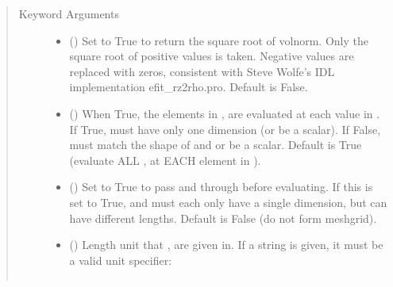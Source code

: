 \documentclass[letterpaper,10pt,english]{sphinxmanual}
\begin{document}
\begin{fulllineitems}
\begin{fulllineitems}
\begin{quote}
\begin{description}
\begin{itemize}
\end{itemize}

\item[{Keyword Arguments}] \leavevmode\begin{itemize}
\item {} 
 () \textendash{} Set to True to return the square root of volnorm.
Only the square root of positive values is taken. Negative
values are replaced with zeros, consistent with Steve Wolfe’s
IDL implementation efit\_rz2rho.pro. Default is False.

\item {} 
 () \textendash{} When True, the elements in ,  are evaluated
at each value in . If True,  must have only one dimension
(or be a scalar). If False,  must match the shape of  and
 or be a scalar. Default is True (evaluate ALL ,  at
EACH element in ).

\item {} 
 () \textendash{} Set to True to pass  and  through
 before evaluating. If this is set to
True,  and  must each only have a single dimension, but
can have different lengths. Default is False (do not form
meshgrid).

\item {} 
 () \textendash{} 
Length unit that ,  are given in.
If a string is given, it must be a valid unit specifier:
\begin{quote}


\begin{savenotes}\sphinxattablestart
\centering
\begin{tabulary}{\linewidth}[t]{|T|T|}
\hline


\end{tabulary}
\end{savenotes}
\end{quote}
\end{itemize}
\end{description}
\end{quote}
\end{fulllineitems}
\end{fulllineitems}
\end{document}
